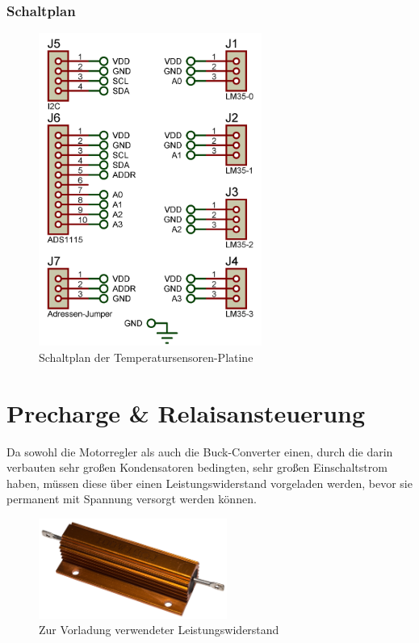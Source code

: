\subsubsection{Schaltplan}
\begin{figure}[h]
    \centering
    \includegraphics[width=0.65\textwidth]{../Proteus/Exports/Temperatursensoren-Platine.png}    
    \caption{Schaltplan der Temperatursensoren-Platine}
\end{figure}

\newpage
\section{Precharge \& Relaisansteuerung}
Da sowohl die Motorregler als auch die Buck-Converter einen, durch die darin verbauten sehr großen Kondensatoren bedingten, sehr großen Einschaltstrom haben, 
müssen diese über einen Leistungswiderstand vorgeladen werden, bevor sie permanent mit Spannung versorgt werden können.\\
\begin{figure}[h]
    \centering
    \includegraphics[width=0.55\textwidth]{Fotos/Leistungswiderstand.png}
    \caption{Zur Vorladung verwendeter Leistungswiderstand}
\end{figure}

